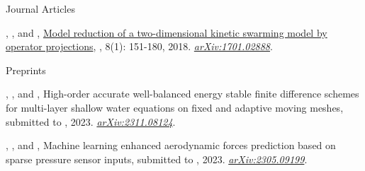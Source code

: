 \begin{cvpublicationsection}{Journal Articles}
%
\item[\pubenum] , , and , \href{https://doi.org/10.4208/eajam.170617.141117a}{Model reduction of a two-dimensional kinetic swarming model by operator projections}, , 8(1): 151-180, 2018. \href{https://arxiv.org/abs/1701.02888}{\em arXiv:1701.02888}.
\end{cvpublicationsection}

\begin{cvpublicationsection}{Preprints}
%
\item[\pubenum] , , and , High-order accurate well-balanced energy stable finite difference schemes for multi-layer shallow water equations on fixed and adaptive moving meshes, submitted to , 2023. \href{https://arxiv.org/abs/2311.08124}{\em arXiv:2311.08124}.
%
\item[\pubenum] , , and , Machine learning enhanced aerodynamic forces prediction based on sparse pressure sensor inputs, submitted to , 2023. \href{https://arxiv.org/abs/2305.09199}{\em arXiv:2305.09199}.
\end{cvpublicationsection}
